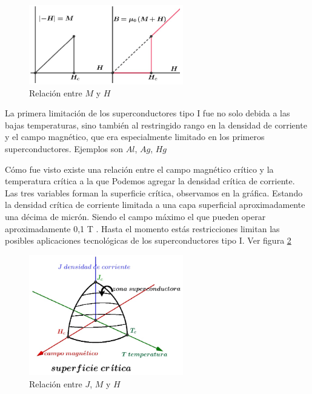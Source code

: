 \begin{figure}[H]
    \centering
    \includegraphics[width=0.6\textwidth]{./Figures/fig418}
	\caption{Relación entre $M$ y $H$}
	\label{fig:418}
\end{figure}

La primera limitación de los superconductores tipo I fue no solo debida a las bajas temperaturas, sino también al restringido rango en la densidad de corriente y el campo magnético, que era especialmente limitado en los primeros superconductores. Ejemplos son $Al$, $Ag$, $Hg$

Cómo fue visto existe una relación entre el campo magnético crítico y la temperatura crítica a la que Podemos agregar la densidad crítica de corriente. Las tres variables forman la superficie crítica, observamos en la gráfica. Estando la densidad crítica de corriente limitada a una capa superficial aproximadamente una décima de micrón. Siendo el campo máximo el que pueden operar aproximadamente 0,1 T . Hasta el momento estás restricciones limitan las posibles aplicaciones tecnológicas de los superconductores tipo I. Ver figura \ref{fig:419}

\begin{figure}[H]
    \centering
    \includegraphics[width=0.6\textwidth]{./Figures/fig419}
	\caption{Relación entre $J$, $M$ y $H$}
	\label{fig:419}
\end{figure}


